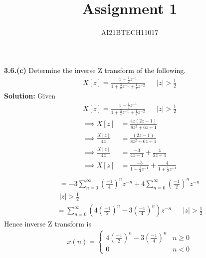 \documentclass[journal,12pt,twocolumn]{IEEEtran}
\title{Assignment 1}
\author{\normalsize AI21BTECH11017}
\newcommand{\solution}{\noindent \textbf{Solution: }}
\providecommand{\abs}[1]{\left\vert#1\right\vert}
\begin{document}
	\maketitle
	
	\textbf{3.6.(c)} 
	Determine the inverse Z transform of the following.\\
    \begin{align}
        X[z]=\frac{1-\frac{1}{2}z^{-1}}{1+\frac{3}{4}z^{-1}+\frac{1}{8}z^{-2}}  &&  \abs{z}>\frac{1}{2}
    \end{align}  
    \solution Given 
    \begin{align}
        X[z]=\frac{1-\frac{1}{2}z^{-1}}{1+\frac{3}{4}z^{-1}+\frac{1}{8}z^{-2}}  &&  \abs{z}>\frac{1}{2}
    \end{align}
    \begin{align}
       \implies X[z] &= \frac{4z(2z-1)}{8z^2+6z+1}\\
       \implies \frac{X[z]}{4z} &= \frac{(2z-1)}{8z^2+6z+1}\\
       \implies \frac{X[z]}{4z} &= \frac{-3}{4z+1} + \frac{4}{2z+1}\\
       \implies X[z] &= \frac{-3}{1+\frac{1}{4}z^{-1}} + \frac{4}{1+\frac{1}{2}z^{-1}}\\
    \end{align}
    \begin{multline}
        = -3\sum_{n=0}^{\infty}\left(\frac{-1}{4}\right)^{n}z^{-n} + 4\sum_{n=0}^{\infty} \left(\frac{-1}{2}\right)^{n}z^{-n}  \\ 
    \abs{z}> \frac{1}{2}
    \end{multline}
    \begin{align}
        = \sum_{n=0}^{\infty}\left(4\left(\frac{-1}{2}\right)^{n} - 3\left(\frac{-1}{4}\right)^{n}\right)z^{-n} &&
        \abs{z}> \frac{1}{2}
    \end{align}
    Hence inverse Z transform is 
    \begin{align}
        x(n) = \begin{cases}
            4\left(\frac{-1}{2}\right)^{n} - 3\left(\frac{-1}{4}\right)^{n} & n \geq 0 \\
            0 & n < 0
        \end{cases}
    \end{align}
\end{document}
